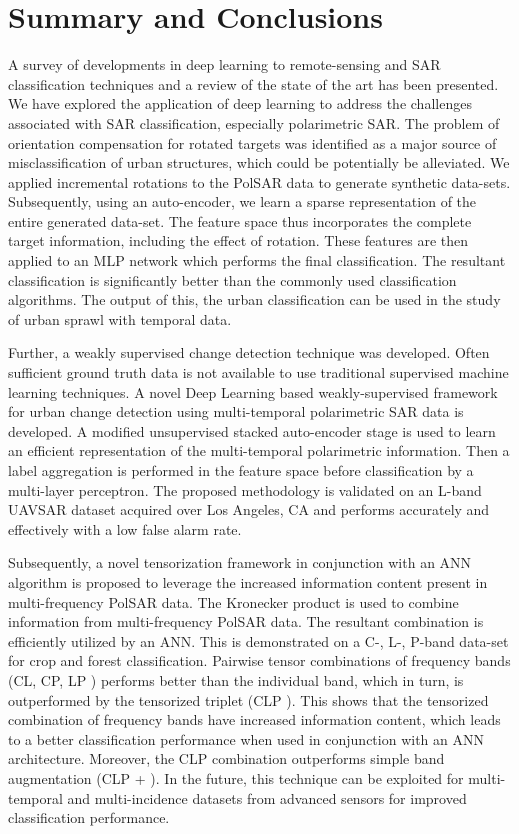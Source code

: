 \chapter{Summary and Conclusions}

A survey of developments in deep learning to remote-sensing and SAR classification techniques and a review of the state of the art has been presented. We have explored the application of deep learning to address the challenges associated with SAR classification, especially polarimetric SAR. The problem of orientation compensation for rotated targets was identified as a major source of misclassification of urban structures, which could be potentially be alleviated. We applied incremental rotations to the PolSAR data to generate synthetic data-sets. Subsequently, using an auto-encoder, we learn a sparse representation of the entire generated data-set. The feature space thus incorporates the complete target information, including the effect of rotation. These features are then applied to an MLP network which performs the final classification. The resultant classification is significantly better than the commonly used classification algorithms. The output of this, the urban classification can be used in the study of urban sprawl with temporal data. 

Further, a weakly supervised change detection technique was developed. 
Often sufficient ground truth data is not available to use traditional supervised machine learning techniques. A novel Deep Learning based weakly-supervised framework for urban change detection using multi-temporal polarimetric SAR data is developed. A modified unsupervised stacked auto-encoder stage is used to learn an efficient representation of the multi-temporal polarimetric information. Then a label aggregation is performed in the feature space before classification by a multi-layer perceptron. The proposed methodology is validated on an L-band UAVSAR dataset acquired over Los Angeles, CA and performs accurately and effectively with a low false alarm rate.  

Subsequently, a novel tensorization framework in conjunction with an ANN algorithm is proposed to leverage the increased information content present in multi-frequency PolSAR data. The Kronecker product is used to combine information from multi-frequency PolSAR data. The resultant combination is efficiently utilized by an ANN. This is demonstrated on a C-, L-, P-band data-set for crop and forest classification. Pairwise tensor combinations of frequency bands (CL, CP, LP ) performs better than the individual band, which in turn, is outperformed by the tensorized triplet (CLP ). This shows that the tensorized combination of frequency bands have increased information content, which leads to a better classification performance when used in conjunction with an ANN architecture. Moreover, the CLP combination outperforms simple band
augmentation (CLP + ). In the future, this technique can be exploited for multi-temporal and multi-incidence datasets from advanced sensors for improved classification performance.

